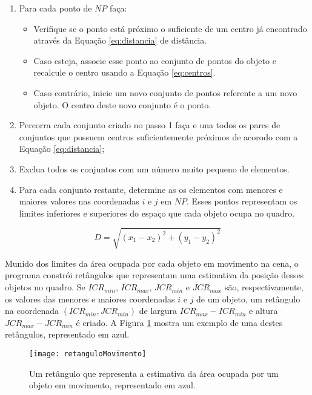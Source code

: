 \begin{enumerate}
\item Para cada ponto de $NP$ faça: 
	\begin{itemize}
		\item Verifique se o ponto está próximo o suficiente de um centro já 				encontrado através da Equação \ref{eq:distancia} de distância.
		\item Caso esteja, associe esse ponto ao conjunto de pontos do objeto e 			recalcule o centro usando a Equação \ref{eq:centros}. 
		\item Caso contrário, inicie um novo conjunto de pontos referente a um 				novo objeto. O centro deste novo conjunto é o ponto.
	\end{itemize}

\item Percorra cada conjunto criado no passo 1 faça e una todos os pares de conjuntos que possuem centros suficientemente próximos de acorodo com a Equação \ref{eq:distancia};

\item Exclua todos os conjuntos com um número muito pequeno de elementos.

\item Para cada conjunto restante, determine as os elementos com menores e maiores valores nas coordenadas $i$ e $j$ em $NP$. Esses pontos representam os limites inferiores e superiores do espaço que cada objeto ocupa no quadro.
\end{enumerate}

\begin{equation}
D = \sqrt{(x_1-x_2)^2+(y_1-y_2)^2}
\label{eq:distancia}
\end{equation}

Munido dos limites da área ocupada por cada objeto em movimento na cena, o programa constrói retângulos que representam uma estimativa da posição desses objetos no quadro. Se $ICR_{min}$, $ICR_{max}$, $JCR_{min}$ e $JCR_{max}$ são, respectivamente, os valores das menores e maiores coordenadas $i$ e $j$ de um objeto, um retângulo na coordenada $(ICR_{min},JCR_{min})$ de largura $ICR_{max}-ICR_{min}$ e altura $JCR_{max}-JCR_{min}$ é criado. A Figura \ref{fig:retanguloMovimento} mostra um exemplo de uma destes retângulos, representado em azul.

\begin{figure}
\centering
\texttt{[image: retanguloMovimento]}
\centering
\caption{Um retângulo que representa a estimativa da área ocupada por um objeto em movimento, representado em azul.}
\label{fig:retanguloMovimento}
\end{figure}


